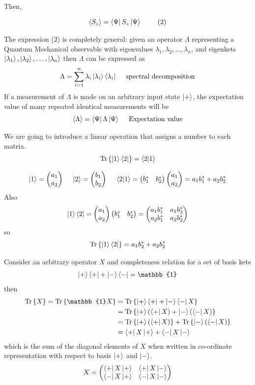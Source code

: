 \documentclass[english, 11pt]{article}
\begin{document}
      Then,

      \[ \E{S_z} = \bra{\Psi}S_z\ket{\Psi} \ \ \ \ \ \ \ (2) \]

      The expression (2) is completely general: given an operator $\Lambda$ representing a Quantum Mechanical observable with eigenvalues $\lambda_1, \lambda_2, \ldots, \lambda_n$, and eigenkets $\left|\lambda_1\right\rangle, \left|\lambda_2\right\rangle, \ldots, \left|\lambda_n\right\rangle$ then $\Lambda$ can be expressed as
      \[ \Lambda = \sum_{i=1}^n \lambda_i \left|\lambda_i\right\rangle\left\langle\lambda_i\right| \ \ \ \ \mbox{spectral decomposition} \]
      If a measurement of $\Lambda$ is made on an arbitrary input state $\left|+\right\rangle$, the expectation value of many repeated identical measurements will be
      \[ \E{\Lambda} = \bra{\Psi}\Lambda\ket{\Psi} \ \ \ \ \mbox{Expectation value} \]

      \begin{defn}[trace]\label{trace}
        We are going to introduce a linear operation that assigns a number to each matrix.
        \[ \trace{\ket{1}\bra{2}} = \braket{2}{1} \]
      \end{defn}

      \begin{exmp}
          \[ \ket{1} = \mtx{a_1 \\ a_2} \ \ \ \ \ket{2} = \mtx{b_1 \\ b_2} \ \ \ \ \braket{2}{1} = \mtx{b_1^* & b_2^*}\mtx{a_1 \\ a_2} = a_1b_1^* + a_2b_2^* \]
          Also
          \[ \left|1\right\rangle\left\langle2\right| = \left(\begin{matrix}a_1 \\ a_2\end{matrix}\right)\left(\begin{matrix}b_1^* & b_2^*\end{matrix}\right) = \left(\begin{matrix}a_1b_1^* & a_1b_2^* \\ a_2b_1^* & a_2b_2^*\end{matrix}\right) \]
          so
          \[ \mbox{Tr}\left\{ \left|1\right\rangle\left\langle2\right| \right\} = a_1b_2^* + a_2b_2^* \]
      \end{exmp}

      Consider an arbitrary operator $X$ and completeness relation for a set of basis kets
      \[ \ket{+}\bra{+} + \ket{-}\bra{-} = \mathbb{1} \]
      then
      \begin{align*}
        \trace{X} = \tr{\mathbb{1}X} & = \tr{\ket{+}\bra{+} + \ket{-}\bra{-}X} \\
                                     & = \tr{\ket{+}\left( \bra{+}X \right) + \ket{-}\left( \bra{-}X \right)} \\
                                     & = \tr{\ket{+}\left( \bra{+}X \right)} + \tr{\ket{-}\left( \bra{-}X \right)} \\
                                     & = \bra{+}X\ket{+} + \bra{-}X\ket{-}
      \end{align*}
      which is the sum of the diagonal elements of $X$ when written in co-ordinate representation with respect to basis $\left|+\right\rangle$ and $\left|-\right\rangle$.
      \[ X = \left(\begin{matrix}\left\langle+\right| X\left|+\right\rangle & \left\langle+\right| X\left|-\right\rangle \\ \left\langle-\right| X\left|+\right\rangle & \left\langle-\right| X\left|-\right\rangle\end{matrix}\right) \]
\end{document}
